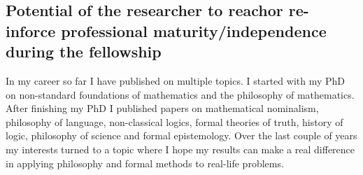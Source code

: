 \documentclass[11pt, a4paper]{article}
\begin{document}





\vspace{-5mm}

\subsection{Potential of the researcher to reachor re-inforce professional maturity/independence during the fellowship}

\vspace{-2mm}


In my career so far I have published on multiple topics. I started with my PhD  on non-standard foundations of mathematics and the philosophy of mathematics. After finishing my PhD I published papers on mathematical nominalism, philosophy of language, non-classical logics, formal theories of truth, history of logic, philosophy of science and formal epistemology. Over the last couple of years my interests turned to a topic where I hope my results can make a  real difference in applying philosophy and formal methods to real-life problems.

\end{document}
